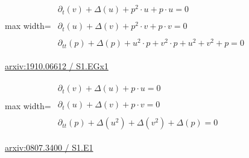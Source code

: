 \documentclass[10pt,a4paper]{article}
\begin{document}
\begin{minipage}{\linewidth}
\begin{center}\begin{adjustbox}{max width=\linewidth}$\displaystyle\begin{gathered}\begin{gathered}\partial_{t}(v)+\Delta(u)+p^{2}\cdot u+p\cdot u=0\end{gathered}\\[5pt]\begin{gathered}\partial_{t}(u)+\Delta(v)+p^{2}\cdot v+p\cdot v=0\end{gathered}\\[5pt]\begin{gathered}\partial_{tt}(p)+\Delta(p)+u^{2}\cdot p+v^{2}\cdot p+u^{2}+v^{2}+p=0\end{gathered}\end{gathered}$\end{adjustbox}\end{center}
{\small \href{https://arxiv.org/html/1910.06612#S1.EGx1}{arxiv:1910.06612 / S1.EGx1}}\par
\end{minipage}\par\vspace{7mm}

\begin{minipage}{\linewidth}
\begin{center}\begin{adjustbox}{max width=\linewidth}$\displaystyle\begin{gathered}\begin{gathered}\partial_{t}(v)+\Delta(u)+p\cdot u=0\end{gathered}\\[5pt]\begin{gathered}\partial_{t}(u)+\Delta(v)+p\cdot v=0\end{gathered}\\[5pt]\begin{gathered}\partial_{tt}(p)+\Delta(u^{2})+\Delta(v^{2})+\Delta(p)=0\end{gathered}\end{gathered}$\end{adjustbox}\end{center}
{\small \href{https://arxiv.org/html/0807.3400#S1.E1}{arxiv:0807.3400 / S1.E1}}\par
\end{minipage}\par\vspace{7mm}
\end{document}
